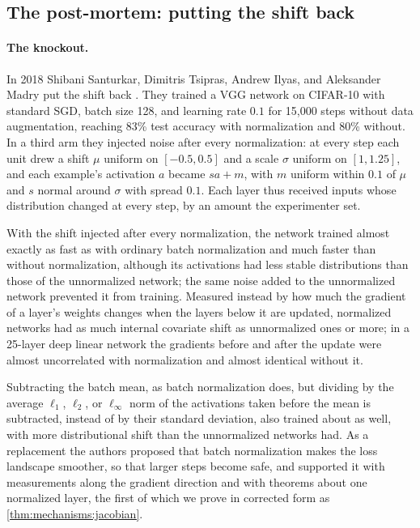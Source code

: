 \begin{refsection}
\section{The post-mortem: putting the shift back}\label{sec:mechanisms:postmortem}

\paragraph{The knockout.} In 2018 Shibani Santurkar, Dimitris Tsipras, Andrew Ilyas, and Aleksander Madry put the shift back \parencite{SanturkarEtAl2018}. They trained a VGG network on CIFAR-10 with standard SGD, batch size 128, and learning rate $0.1$ for 15,000 steps without data augmentation, reaching 83\% test accuracy with normalization and 80\% without. In a third arm they injected noise after every normalization: at every step each unit drew a shift $\mu$ uniform on $[-0.5,0.5]$ and a scale $\sigma$ uniform on $[1,1.25]$, and each example's activation $a$ became $sa+m$, with $m$ uniform within $0.1$ of $\mu$ and $s$ normal around $\sigma$ with spread $0.1$. Each layer thus received inputs whose distribution changed at every step, by an amount the experimenter set.

\begin{finding}\label{fd:mechanisms:santurkar}
With the shift injected after every normalization, the network trained almost exactly as fast as with ordinary batch normalization and much faster than without normalization, although its activations had less stable distributions than those of the unnormalized network; the same noise added to the unnormalized network prevented it from training. Measured instead by how much the gradient of a layer's weights changes when the layers below it are updated, normalized networks had as much internal covariate shift as unnormalized ones or more; in a 25-layer deep linear network the gradients before and after the update were almost uncorrelated with normalization and almost identical without it.
\end{finding}

Subtracting the batch mean, as batch normalization does, but dividing by the average $\ell_1$, $\ell_2$, or $\ell_\infty$ norm of the activations taken before the mean is subtracted, instead of by their standard deviation, also trained about as well, with more distributional shift than the unnormalized networks had. As a replacement the authors proposed that batch normalization makes the loss landscape smoother, so that larger steps become safe, and supported it with measurements along the gradient direction and with theorems about one normalized layer, the first of which we prove in corrected form as \cref{thm:mechanisms:jacobian}.


\end{refsection}

